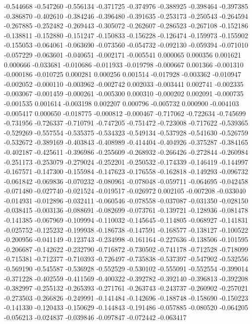 -0.544668
-0.547260
-0.556134
-0.371725
-0.374976
-0.388925
-0.398464
-0.397385
-0.386870
-0.402610
-0.384246
-0.396480
-0.391635
-0.253173
-0.250543
-0.264594
-0.267885
-0.252482
-0.269443
-0.305072
-0.262607
-0.286523
-0.267108
-0.152186
-0.138811
-0.152880
-0.151247
-0.150833
-0.156228
-0.126474
-0.159973
-0.155902
-0.155053
-0.064061
-0.063690
-0.073560
-0.054732
-0.092130
-0.059394
-0.071010
-0.057229
-0.063601
-0.040651
-0.002171
-0.005541
0.000065
0.000356
0.001621
0.000666
-0.033681
-0.010686
-0.011933
-0.019798
-0.000667
0.001366
-0.001310
-0.000186
-0.010725
0.000281
0.000256
0.001514
-0.017928
-0.003362
-0.010947
-0.002052
-0.000110
-0.003962
-0.002742
0.002033
-0.003441
0.002741
-0.002335
-0.003067
-0.001459
-0.000261
-0.005300
0.000310
-0.000202
0.002091
-0.000735
-0.001535
0.001614
-0.003198
0.002207
0.000796
-0.005732
0.000900
-0.004103
-0.005417
0.000650
-0.018775
-0.000812
-0.000467
-0.717062
-0.722634
-0.745699
-0.731956
-0.726337
-0.710791
-0.747205
-0.751472
-0.723008
-0.717622
-0.539365
-0.529269
-0.557554
-0.535375
-0.534323
-0.549134
-0.537928
-0.541630
-0.526759
-0.532672
-0.389169
-0.403843
-0.408989
-0.414404
-0.404926
-0.375287
-0.384165
-0.402187
-0.425611
-0.396986
-0.255609
-0.268932
-0.266426
-0.272844
-0.260984
-0.251173
-0.253079
-0.279024
-0.252201
-0.250532
-0.174339
-0.146419
-0.144997
-0.167571
-0.147300
-0.155984
-0.147623
-0.176558
-0.162818
-0.149293
-0.096732
-0.061842
-0.069836
-0.070232
-0.080961
-0.078048
-0.059711
-0.064695
-0.042458
-0.071480
-0.027740
-0.021524
-0.019517
-0.026972
0.002105
-0.007208
-0.033040
-0.014931
-0.012896
-0.032411
-0.060546
-0.078558
-0.037087
-0.031350
-0.028150
-0.038415
-0.003136
-0.088691
-0.082699
-0.073761
-0.139721
-0.128936
-0.081478
-0.141385
-0.067969
-0.109994
-0.110032
-0.145645
-0.114805
-0.068927
-0.141831
-0.025752
-0.125232
-0.199938
-0.186738
-0.147591
-0.168577
-0.138127
-0.100522
-0.200956
-0.041149
-0.123743
-0.234998
-0.161164
-0.227636
-0.138506
-0.101595
-0.206687
-0.142622
-0.232790
-0.716872
-0.730502
-0.741178
-0.712528
-0.718099
-0.715381
-0.712377
-0.710393
-0.726497
-0.735838
-0.537397
-0.547902
-0.532556
-0.569190
-0.545587
-0.536928
-0.552529
-0.530102
-0.555091
-0.552554
-0.399014
-0.371228
-0.402559
-0.411569
-0.400322
-0.392782
-0.392140
-0.396813
-0.392208
-0.382997
-0.255132
-0.265393
-0.271761
-0.263743
-0.243737
-0.260902
-0.257021
-0.273503
-0.266826
-0.249991
-0.141484
-0.142696
-0.188748
-0.158690
-0.150223
-0.141330
-0.120433
-0.150629
-0.144843
-0.191486
-0.057885
-0.080520
-0.064205
-0.056213
-0.024837
-0.039846
-0.097847
-0.072442
-0.063417
